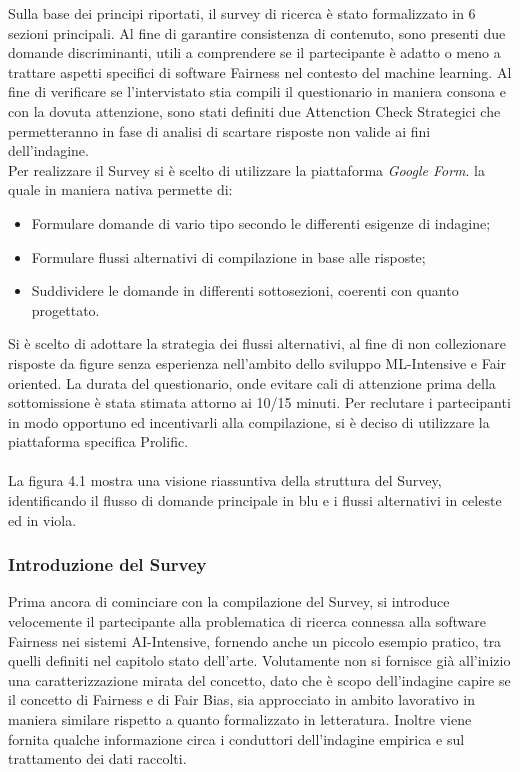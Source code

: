     Sulla base dei principi riportati, il survey di ricerca è stato formalizzato in 6 sezioni principali. Al fine di garantire consistenza di contenuto, sono presenti due domande discriminanti, utili a comprendere se il partecipante è adatto o meno a trattare aspetti specifici di software Fairness nel contesto del machine learning. Al fine di verificare se l'intervistato stia compili il questionario in maniera consona e con la dovuta attenzione, sono stati definiti due Attenction Check Strategici che permetteranno in fase di analisi di scartare risposte non valide ai fini dell'indagine.\\ 
    
    Per realizzare il Survey si è scelto di utilizzare la piattaforma \emph{Google Form}. la quale in maniera nativa permette di:
    \
    \begin{itemize}
        \item Formulare domande di vario tipo secondo le differenti esigenze di indagine;
        \item Formulare flussi alternativi di compilazione in base alle risposte;
        \item Suddividere le domande in differenti sottosezioni, coerenti con quanto progettato.
    \end{itemize}
    
    Si è scelto di adottare la strategia dei flussi alternativi, al fine di non collezionare risposte da figure senza esperienza nell'ambito dello sviluppo ML-Intensive e Fair oriented. La durata del questionario, onde evitare cali di attenzione prima della sottomissione è stata stimata attorno ai 10/15 minuti. Per reclutare i partecipanti in modo opportuno ed incentivarli alla compilazione, si è deciso di utilizzare la piattaforma specifica Prolific.\\ \\
    
    La figura 4.1 mostra una visione riassuntiva della struttura del Survey, identificando il flusso di domande principale in blu e i flussi alternativi in celeste ed in viola. 
    
   \subsubsection{Introduzione del Survey}
   Prima ancora di cominciare con la  compilazione del Survey, si introduce velocemente il partecipante alla problematica di ricerca connessa alla software Fairness nei sistemi AI-Intensive, fornendo anche un piccolo esempio pratico, tra quelli definiti nel capitolo stato dell'arte. Volutamente non si fornisce già all'inizio una caratterizzazione mirata del concetto, dato che è scopo dell'indagine capire se il concetto di Fairness e di Fair Bias, sia approcciato in ambito lavorativo in maniera similare rispetto a quanto formalizzato in letteratura. Inoltre viene fornita qualche informazione circa i conduttori dell'indagine empirica e sul trattamento dei dati raccolti. 
   
